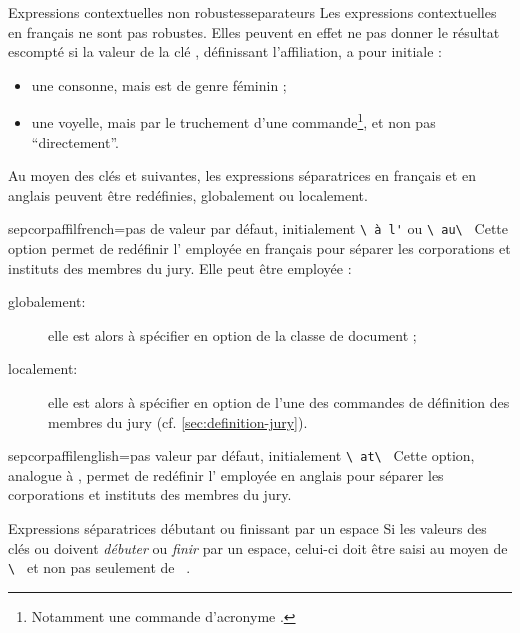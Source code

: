 \begin{dbwarning}{Expressions contextuelles non robustes}{separateurs}
  Les expressions contextuelles en français ne sont pas robustes. Elles peuvent
  en effet ne pas donner le résultat escompté si la valeur de la clé
  , définissant l'affiliation, a pour initiale :
  \begin{itemize}
  \item une consonne, mais est de genre féminin ;
  \item une voyelle, mais par le truchement d'une commande\footnote{Notamment
      une commande d'acronyme .}, et non pas \enquote{directement}.
  \end{itemize}
\end{dbwarning}

Au moyen des clés  et 
suivantes, les expressions séparatrices en français et en anglais peuvent être
redéfinies, globalement ou localement.

\begin{docKey}{sepcorpaffilfrench}{=}{pas de valeur par
    défaut, initialement \lstinline[showspaces]+\ à l'+ ou \lstinline[showspaces]+\ au\ +}
  Cette option permet de redéfinir l' employée en français
  pour séparer les corporations et instituts des membres du jury. Elle peut
  être employée :
  \begin{description}
  \item[globalement:] elle est alors à spécifier en option de la classe de
    document ;
  \item[localement:] elle est alors à spécifier en option de l'une des
    commandes de définition des membres du jury (cf.
    \vref{sec:definition-jury}).
  \end{description}
\end{docKey}

\begin{docKey}{sepcorpaffilenglish}{=}{pas valeur par
    défaut, initialement \lstinline[showspaces]+\ at\ +}
  Cette option, analogue à , permet de redéfinir
  l' employée en anglais pour séparer les corporations et
  instituts des membres du jury.
\end{docKey}

\begin{dbwarning}{Expressions séparatrices débutant ou finissant par un espace}{}
  Si les valeurs des clés  ou
   doivent \emph{débuter} ou \emph{finir} par
  un espace, celui-ci doit être saisi au moyen de
  \lstinline[showspaces]+\ +
  et non pas seulement de
  \lstinline[showspaces]+ +.
\end{dbwarning}

